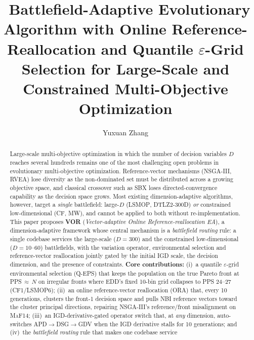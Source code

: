 \documentclass[preprint,12pt]{elsarticle}
\begin{document}
\begin{frontmatter}

\title{\ Battlefield-Adaptive Evolutionary
Algorithm with Online Reference-Reallocation and Quantile
$\varepsilon$-Grid Selection for Large-Scale and Constrained
Multi-Objective Optimization}

\author[a]{Yuxuan Zhang}
\address[a]{Graduate School, Army Engineering University of
PLA, Nanjing, China}

\begin{abstract}
Large-scale multi-objective optimization in which the number of decision
variables $D$ reaches several hundreds remains one of the most challenging
open problems in evolutionary multi-objective optimization. Reference-vector
mechanisms (NSGA-III, RVEA) lose diversity as the non-dominated set must be
distributed across a growing objective space, and classical crossover such as
SBX loses directed-convergence capability as the decision space grows. Most
existing dimension-adaptive algorithms, however, target a \emph{single}
battlefield: large-$D$ (\textsc{LSMOP}, \textsc{DTLZ2}-300D) \emph{or}
constrained low-dimensional (\textsc{CF}, \textsc{MW}), and cannot be applied
to both without re-implementation. This paper proposes
\textbf{VOR} (\emph{Vector-adaptive Online Reference-reallocation EA}), a
dimension-adaptive framework whose central mechanism is a
\emph{battlefield routing} rule: a single codebase services the
large-scale ($D=300$) and the constrained low-dimensional ($D=10$--$60$)
battlefields, with the variation operator, environmental selection and
reference-vector reallocation jointly gated by the initial IGD scale, the
decision dimension, and the presence of constraints.
\textbf{Core contributions:}
(i)~a quantile $\varepsilon$-grid environmental selection (\textsc{Q-EPS})
that keeps the population on the true Pareto front at PPS$\,\approx\,N$ on
irregular fronts where EDD's fixed 10-bin grid collapses to PPS 24--27
(\textsc{CF1}/\textsc{LSMOP6});
(ii)~an online reference-vector reallocation (\textsc{ORA}) that, every 10
generations, clusters the front-1 decision space and pulls NBI reference
vectors toward the cluster principal directions, repairing NSGA-III's
reference/front misalignment on \textsc{MaF14};
(iii)~an IGD-derivative-gated operator switch that, at \emph{any} dimension,
auto-switches APD$\to$DSG$\to$GDV when the IGD derivative stalls for 10
generations; and
(iv)~the \emph{battlefield routing} rule that makes one codebase service

\end{abstract}
\end{frontmatter}
\end{document}
